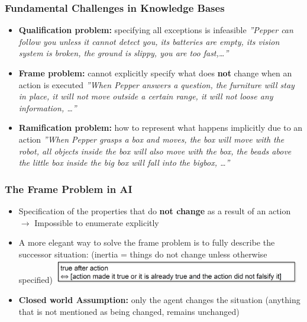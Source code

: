 \documentclass[conference, a4paper]{styles/acmsiggraph}
\begin{document}
        \subsubsection{Fundamental Challenges in Knowledge Bases}
            \begin{itemize}
                \item \textbf{Qualification problem:} specifying all exceptions is infeasible\newline
                    \textit{''Pepper can follow you unless it cannot detect you, its batteries are empty, its vision system is broken, the ground is slippy, you are too fast,…''}
                \item \textbf{Frame problem:} cannot explicitly specify what does \textbf{not} change when an action is executed\newline
                    \textit{''When Pepper answers a question, the furniture will stay in place, it will not move outside a certain range, it will not loose any information, …''}
                \item \textbf{Ramification problem:} how to represent what happens implicitly due to an action
                    \textit{''When Pepper grasps a box and moves, the box will move with the robot, all objects inside the box will also move with the box, the beads above the little box inside the big box will fall into the bigbox, …''}
            \end{itemize}
        
        \subsubsection{The Frame Problem in AI}
            \begin{itemize}
                \item Specification of the properties that do \textbf{not change} as a result of an action\newline
                    $\rightarrow$ Impossible to enumerate explicitly
                \item A more elegant way to solve the frame problem is to fully describe the successor situation: (inertia = things do not change unless otherwise specified)\newline
                    \includegraphics[width=0.85\textwidth]{imgs/FrameProblemInAI.png}
                \item \textbf{Closed world Assumption:} only the agent changes the situation (anything that is not mentioned as being changed, remains unchanged)
            \end{itemize}
    
\end{document}

